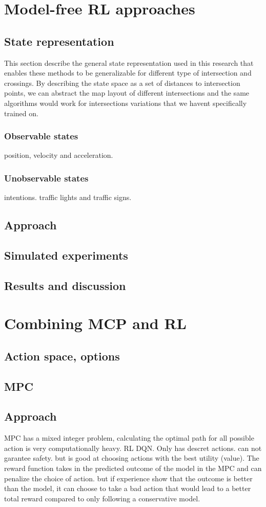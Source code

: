 \chapter{Model-free RL approaches}
\section{State representation}
This section describe the general state representation used in this research that enables these methods to be generalizable for different type of intersection and crossings. 
By describing the state space as a set of distances to intersection points, we can abstract the map layout of different intersections and the same algorithms would work for intersections variations that we havent specifically trained on. 
\subsection{Observable states}
position, velocity and acceleration. 
\subsection{Unobservable states}
intentions. traffic lights and traffic signs. 
\section{Approach}
\section{Simulated experiments}
\section{Results and discussion}

\chapter{Combining MCP and RL}
\section{Action space, options}
\section{MPC}
\section{Approach}
MPC has a mixed integer problem, calculating the optimal path for all possible action is very computationally heavy. 
RL DQN. Only has descret actions. can not garantee safety. but is good at choosing actions with the best utility (value). 
The reward function takes in the predicted outcome of the model in the MPC and can penalize the choice of action. but if experience show that the outcome is better than the model, it can choose to take a bad action that would lead to a better total reward compared to only following a conservative model. 

